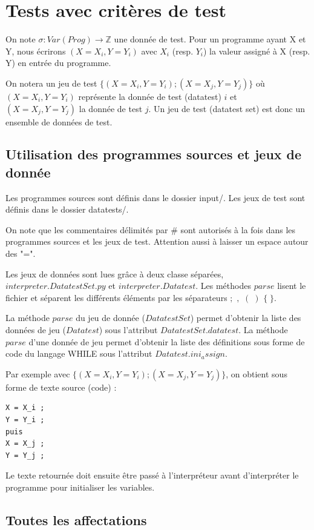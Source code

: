 \documentclass[a4paper]{article}
\begin{document}
\section{Tests avec critères de test}

On note $\sigma : Var(Prog) \rightarrow \mathbb{Z} $ une donnée de test. Pour un programme ayant X et Y, nous écrirons $(X=X_i, Y=Y_i)$ avec $X_i$ (resp. $Y_i$) la valeur assigné à X (resp. Y) en entrée du programme.

On notera un jeu de test $\{(X=X_i, Y=Y_i);(X=X_j, Y=Y_j)\}$ où $(X=X_i, Y=Y_i)$ représente la donnée de test (datatest) $i$ et $(X=X_j, Y=Y_j)$ la donnée de test $j$. Un jeu de test (datatest set) est donc un ensemble de données de test.

\subsection{Utilisation des programmes sources et jeux de donnée}

Les programmes sources sont définis dans le dossier input/. 
Les jeux de test sont définis dans le dossier datatests/. 

On note que les commentaires délimités par \# sont autorisés à la fois dans les programmes sources et les jeux de test. Attention aussi à laisser un espace autour des "=". 

Les jeux de données sont lues grâce à deux classe séparées, $interpreter.DatatestSet.py$ et $interpreter.Datatest$. Les méthodes $parse$ lisent le fichier et séparent les différents éléments par les séparateurs $;$  $,$  $(\;)$  $\{\;\}$.

La méthode $parse$ du jeu de donnée ($DatatestSet$) permet d'obtenir la liste des données de jeu ($Datatest$) sous l'attribut $DatatestSet.datatest$. La méthode $parse$ d'une donnée de jeu permet d'obtenir la liste des définitions sous forme de code du langage WHILE sous l'attribut $Datatest.ini_assign$.

Par exemple avec $\{(X=X_i, Y=Y_i);(X=X_j, Y=Y_j)\}$, on obtient sous forme de texte source (code) :
\begin{verbatim}
X = X_i ; 
Y = Y_i ; 
puis
X = X_j ; 
Y = Y_j ; 
\end{verbatim}

Le texte retournée doit ensuite être passé à l'interpréteur avant d'interpréter le programme pour initialiser les variables. 

\subsection{Toutes les affectations}
\end{document}
